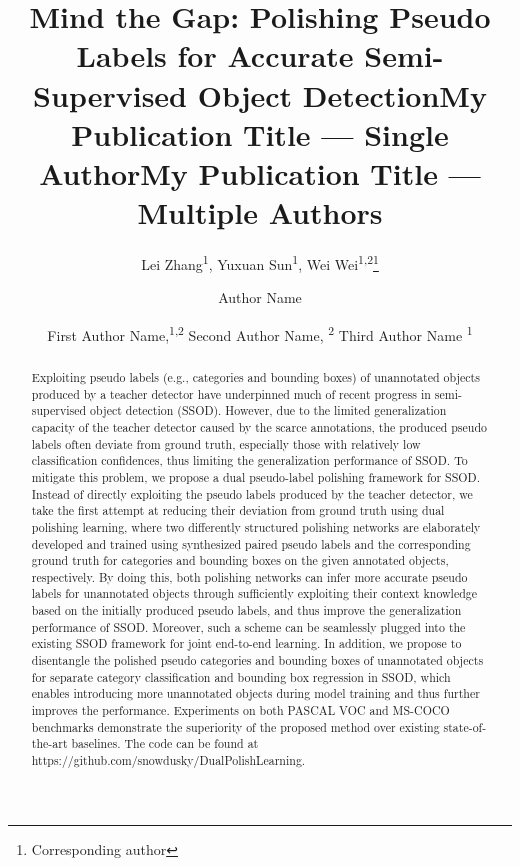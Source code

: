 \documentclass[letterpaper]{article} \usepackage{aaai23}  \usepackage{times}  \usepackage{helvet}  \usepackage{courier}  \usepackage[hyphens]{url}  \usepackage{graphicx} \urlstyle{rm} \def\UrlFont{\rm}  \usepackage{natbib}  \usepackage{caption} \frenchspacing  \setlength{\pdfpagewidth}{8.5in}  \setlength{\pdfpageheight}{11in}  \usepackage{algorithm}
\title{Mind the Gap: Polishing Pseudo Labels for Accurate Semi-Supervised Object Detection}
\author{
Lei Zhang\textsuperscript{\rm 1}\equalcontrib, 
    Yuxuan Sun\textsuperscript{\rm 1}\equalcontrib,
    Wei Wei\textsuperscript{\rm 1,}\textsuperscript{\rm 2}\thanks{Corresponding author}
}
\title{My Publication Title --- Single Author}
\author {
    Author Name
}
\title{My Publication Title --- Multiple Authors}
\author {
First Author Name,\textsuperscript{\rm 1,\rm 2}
    Second Author Name, \textsuperscript{\rm 2}
    Third Author Name \textsuperscript{\rm 1}
}
\begin{document}
\maketitle

\begin{abstract}
    Exploiting pseudo labels (e.g., categories and bounding boxes) of unannotated objects produced by a teacher detector have underpinned much of recent progress in semi-supervised object detection (SSOD). However, due to the limited generalization capacity of the teacher detector caused by the scarce annotations, the produced pseudo labels often deviate from ground truth, especially those with relatively low classification confidences, thus limiting the generalization performance of SSOD. To mitigate this problem, we propose a dual pseudo-label polishing framework for SSOD. Instead of directly exploiting the pseudo labels produced by the teacher detector, we take the first attempt at reducing their deviation from ground truth using dual polishing learning, where two differently structured polishing networks are elaborately developed and trained using synthesized paired pseudo labels and the corresponding ground truth for categories and bounding boxes on the given annotated objects, respectively. By doing this, both polishing networks can infer more accurate pseudo labels for unannotated objects through sufficiently exploiting their context knowledge based on the initially produced pseudo labels, and thus improve the generalization performance of SSOD. Moreover, such a scheme can be seamlessly plugged into the existing SSOD framework for joint end-to-end learning. In addition, we propose to disentangle the polished pseudo categories and bounding boxes of unannotated objects for separate category classification and bounding box regression in SSOD, which enables introducing more unannotated objects during model training and thus further improves the performance. Experiments on both PASCAL VOC and MS-COCO benchmarks demonstrate the superiority of the proposed method over existing state-of-the-art baselines. The code can be found at https://github.com/snowdusky/DualPolishLearning.
\end{abstract}
\end{document}
